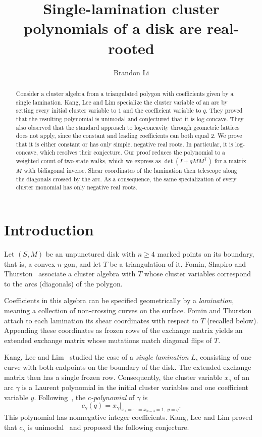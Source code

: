 \documentclass[11pt]{amsart}
\title{Single-lamination cluster polynomials of a disk are real-rooted}
\author{Brandon Li}
\theoremstyle{remark}
\numberwithin{equation}{section}
\begin{document}
\begin{abstract}
Consider a cluster algebra from a triangulated polygon with coefficients given
by a single lamination. Kang, Lee and Lim specialize the cluster variable of an
arc by setting every initial cluster variable to $1$ and the coefficient
variable to $q$. They proved that the resulting polynomial is unimodal and
conjectured that it is log-concave. They also observed that the standard
approach to log-concavity through geometric lattices does not apply, since the
constant and leading coefficients can both equal $2$. We prove that it is either constant or has
only simple, negative real roots. In particular, it is log-concave, which
resolves their conjecture. Our proof reduces the polynomial to a weighted count
of two-state walks, which we express as $\det(I+qMM^{\mathsf T})$ for a matrix
$M$ with bidiagonal inverse. Shear coordinates of the lamination then
telescope along the diagonals crossed by the arc. As a consequence, the same
specialization of every cluster monomial has only negative real roots.
\end{abstract}

\maketitle

\section{Introduction}

Let $(S,M)$ be an unpunctured disk with $n\ge4$ marked points on its boundary,
that is, a convex $n$-gon, and let $T$ be a triangulation of it. Fomin,
Shapiro and Thurston~\cite{FST} associate a cluster algebra with $T$ whose
cluster variables correspond to the arcs (diagonals) of the polygon.

Coefficients in this algebra can be specified geometrically by a
\emph{lamination}, meaning a collection of non-crossing curves on the surface.
Fomin and Thurston~\cite{FT} attach to each lamination its shear coordinates
with respect to $T$ (recalled below). Appending these coordinates as frozen
rows of the exchange matrix yields an extended exchange matrix whose mutations
match diagonal flips of $T$.

Kang, Lee and Lim~\cite{KLL} studied the case of a \emph{single lamination}
$L$, consisting of one curve with both endpoints on the boundary of the disk.
The extended exchange matrix then has a single frozen row. Consequently, the
cluster variable $x_\gamma$ of an arc $\gamma$ is a Laurent polynomial in the
initial cluster variables and one coefficient variable $y$.
Following~\cite[Definition~20]{KLL}, the \emph{$c$-polynomial} of $\gamma$ is
\[
c_\gamma(q)=x_\gamma\big|_{x_1=\cdots=x_{n-3}=1,\ y=q}.
\]
This polynomial has nonnegative integer coefficients. Kang, Lee and Lim proved
that $c_\gamma$ is unimodal~\cite[Theorem~14]{KLL} and proposed the following
conjecture.
\end{document}
